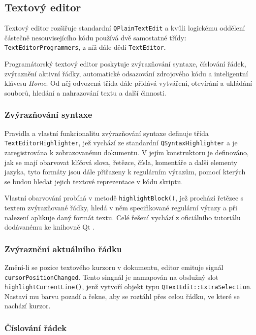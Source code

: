 \documentclass[11pt,twoside,a4paper]{book}
\begin{document}
\subsection{Textový editor}

Textový editor rozšiřuje standardní \texttt{QPlainTextEdit} a kvůli logickému oddělení částečně nesouvisejícího kódu používá dvě samostatné třídy: \texttt{TextEditorProgrammers}, z níž dále dědí \texttt{TextEditor}.

Programátorský textový editor poskytuje zvýrazňování syntaxe, číslování řádek, zvýraznění aktivní řádky, automatické odsazování zdrojového kódu a inteligentní klávesu \textit{Home}. Od něj odvozená třída dále přidává vytváření, otevírání a ukládání souborů, hledání a nahrazování textu a další činnosti.


\subsubsection{Zvýrazňování syntaxe}

Pravidla a vlastní funkcionalitu zvýrazňování syntaxe definuje třída \texttt{Text\-E\-di\-tor\-High\-ligh\-ter}, jež vychází ze standardní \texttt{QSyntaxHighlighter} a je zaregistrována k zobrazovanému dokumentu. V jejím konstruktoru je definováno, jak se mají obarvovat klíčová slova, řetězce, čísla, komentáře a další elementy jazyka, tyto formáty jsou dále přiřazeny k regulárním výrazům, pomocí kterých se budou hledat jejich textové reprezentace v kódu skriptu.

Vlastní obarvování probíhá v metodě \texttt{highlightBlock()}, jež prochází řetězec s textem zvýrazňované řádky, hledá v něm specifikované regulární výrazy a při nalezení aplikuje daný formát textu. Celé řešení vychází z oficiálního tutoriálu dodávanému ke knihovně Qt \cite{syntax_highlighter_example}.


\subsubsection{Zvýraznění aktuálního řádku}

Změní-li se pozice textového kurzoru v dokumentu, editor emituje signál \texttt{cur\-sor\-Po\-si\-ti\-on\-Chan\-ged}. Tento singnál je namapován na obslužný slot \texttt{highlightCurrentLine()}, jenž vytvoří objekt typu \texttt{QTextEdit::ExtraSelection}. Nastaví mu barvu pozadí a řekne, aby se roztáhl přes celou řádku, ve které se nachází kurzor.


\subsubsection{Číslování řádek}
\end{document}
